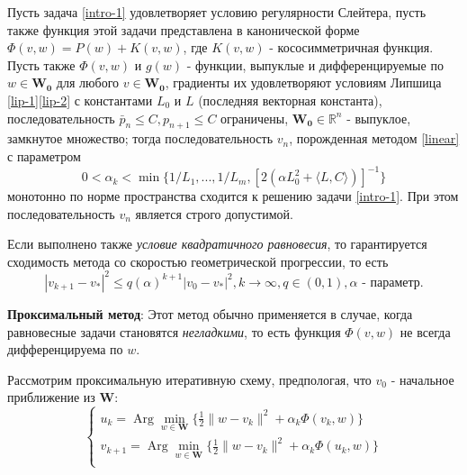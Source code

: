 \begin{theo}
	Пусть задача \eqref{intro-1} удовлетворяет условию регулярности Слейтера, пусть также функция этой задачи представлена в канонической форме $\Phi(v,w)=P(w)+K(v,w)$, где $K(v,w)$ - кососимметричная функция. Пусть также $\Phi(v,w)$ и $g(w)$ - функции, выпуклые и дифференцируемые по $w\in\mathbf{W_0}$ для любого $v\in\mathbf{W_0}$, градиенты их удовлетворяют условиям Липшица \eqref{lip-1}\eqref{lip-2} с константами $L_0$ и $L$ (последняя векторная константа), последовательность $\bar{p}_n\leqslant C,p_{n+1}\leqslant C$ ограничены\cite{7}, $\mathbf{W_0}\in \mathbb{R}^n$ - выпуклое, замкнутое множество; тогда последовательность $v_n$, порожденная методом \eqref{linear} с параметром
	\begin{equation*}
	0<\alpha_k<\min\{1/L_1,...,1/L_m,[2(\alpha L_0^2+\langle L,C\rangle )]^{-1} \}
	\end{equation*}
	монотонно по норме пространства сходится к решению задачи \eqref{intro-1}. При этом последовательность $v_n$ является строго допустимой\cite{7}.
\end{theo}
Если выполнено также \textit{условие квадратичного равновесия}\cite{8}, то гарантируется сходимость метода со скоростью геометрической прогрессии, то есть
\begin{equation*}
|v_{k+1}-v_*|^2\leqslant q(\alpha)^{k+1}|v_0-v_*|^2, k\to \infty, q\in(0,1), \alpha\text{ - параметр}.
\end{equation*}

\textbf{Проксимальный метод}: Этот метод обычно применяется в случае, когда равновесные задачи становятся \textit{негладкими}, то есть функция $\Phi(v,w)$ не всегда дифференцируема по $w$.

Рассмотрим проксимальную итеративную схему, предпологая, что $v_0$ - начальное приближение из $\mathbf{W}$:
\begin{equation}
\label{approx}
\left\{\begin{array}{l}
u_k=\operatorname{Arg}\min\limits_{w\in\mathbf{W}}\big\{ \frac{1}{2}\|w-v_k\|^2+\alpha_k\Phi(v_k,w)\big\}\\
v_{k+1}=\operatorname{Arg}\min\limits_{w\in\mathbf{W}}\big\{ \frac{1}{2}\|w-v_k\|^2+\alpha_k\Phi(u_k,w)\big\}\\
\end{array}
\right.
\end{equation}

